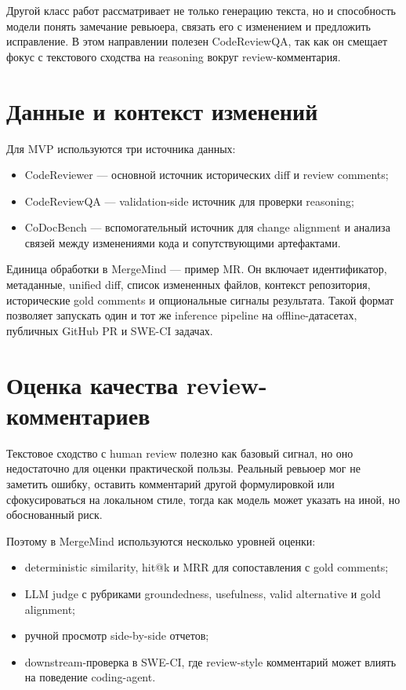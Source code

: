 \documentclass[14pt,a4paper]{extreport}
\begin{document}
Другой класс работ рассматривает не только генерацию текста, но и способность
модели понять замечание ревьюера, связать его с изменением и предложить
исправление. В этом направлении полезен CodeReviewQA, так как он смещает фокус
с текстового сходства на reasoning вокруг review-комментария.

\section{Данные и контекст изменений}

Для MVP используются три источника данных:

\begin{itemize}
  \item CodeReviewer --- основной источник исторических diff и review comments;
  \item CodeReviewQA --- validation-side источник для проверки reasoning;
  \item CoDocBench --- вспомогательный источник для change alignment и анализа
    связей между изменениями кода и сопутствующими артефактами.
\end{itemize}

Единица обработки в MergeMind --- пример MR. Он включает идентификатор,
метаданные, unified diff, список измененных файлов, контекст репозитория,
исторические gold comments и опциональные сигналы результата. Такой формат
позволяет запускать один и тот же inference pipeline на offline-датасетах,
публичных GitHub PR и SWE-CI задачах.

\section{Оценка качества review-комментариев}

Текстовое сходство с human review полезно как базовый сигнал, но оно
недостаточно для оценки практической пользы. Реальный ревьюер мог не заметить
ошибку, оставить комментарий другой формулировкой или сфокусироваться на
локальном стиле, тогда как модель может указать на иной, но обоснованный риск.

Поэтому в MergeMind используются несколько уровней оценки:

\begin{itemize}
  \item deterministic similarity, hit@k и MRR для сопоставления с gold comments;
  \item LLM judge с рубриками groundedness, usefulness, valid alternative и
    gold alignment;
  \item ручной просмотр side-by-side отчетов;
  \item downstream-проверка в SWE-CI, где review-style комментарий может
    влиять на поведение coding-agent.
\end{itemize}
\end{document}

